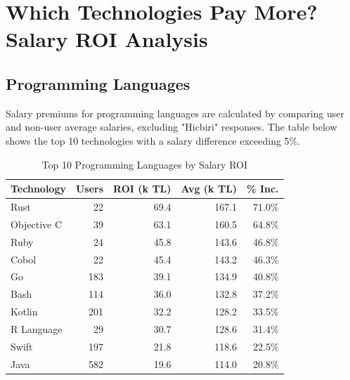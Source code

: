 \documentclass[12pt,a4paper]{article}
\begin{document}
\section{Which Technologies Pay More? Salary ROI Analysis}

\subsection{Programming Languages}
Salary premiums for programming languages are calculated by comparing user and non-user average salaries, excluding "Hicbiri" responses. The table below shows the top 10 technologies with a salary difference exceeding 5\%.

\begin{table}[H]
	\centering
	\small
	\begin{tabular}{lrrrr}
		\toprule
		\textbf{Technology} & \textbf{Users} & \textbf{ROI (k TL)} & \textbf{Avg (k TL)} & \textbf{\% Inc.} \\
		\midrule
		Rust                & 22             & 69.4                & 167.1               & 71.0\%           \\
		Objective C         & 39             & 63.1                & 160.5               & 64.8\%           \\
		Ruby                & 24             & 45.8                & 143.6               & 46.8\%           \\
		Cobol               & 22             & 45.4                & 143.2               & 46.3\%           \\
		Go                  & 183            & 39.1                & 134.9               & 40.8\%           \\
		Bash                & 114            & 36.0                & 132.8               & 37.2\%           \\
		Kotlin              & 201            & 32.2                & 128.2               & 33.5\%           \\
		R Language          & 29             & 30.7                & 128.6               & 31.4\%           \\
		Swift               & 197            & 21.8                & 118.6               & 22.5\%           \\
		Java                & 582            & 19.6                & 114.0               & 20.8\%           \\
		\bottomrule
	\end{tabular}
	\caption{Top 10 Programming Languages by Salary ROI}
\end{table}
\end{document}
